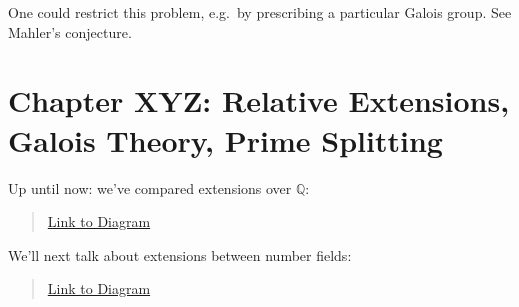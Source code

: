 \begin{remark}

One could restrict this problem, e.g.~by prescribing a particular Galois
group. See Mahler's conjecture.

\end{remark}

\hypertarget{chapter-xyz-relative-extensions-galois-theory-prime-splitting}{%
\section{Chapter XYZ: Relative Extensions, Galois Theory, Prime
Splitting}\label{chapter-xyz-relative-extensions-galois-theory-prime-splitting}}

\begin{remark}

Up until now: we've compared extensions over \({\mathbb{Q}}\):

\begin{center}
\end{center}

\begin{quote}
\href{https://q.uiver.app/?q=WzAsNCxbMCwwLCJLIl0sWzAsMiwiXFxRUSJdLFsyLDAsIlxcWlpfSyJdLFsyLDIsIlxcWloiXSxbMCwxLCIiLDAseyJzdHlsZSI6eyJoZWFkIjp7Im5hbWUiOiJub25lIn19fV0sWzIsMywiIiwwLHsic3R5bGUiOnsiaGVhZCI6eyJuYW1lIjoibm9uZSJ9fX1dXQ==}{Link
to Diagram}
\end{quote}

We'll next talk about extensions between number fields:

\begin{center}
\end{center}

\begin{quote}
\href{https://q.uiver.app/?q=WzAsNCxbMCwwLCJMIl0sWzAsMiwiSyJdLFsyLDAsIlxcWlpfTCJdLFsyLDIsIlxcWlpfSyJdLFswLDEsIiIsMCx7InN0eWxlIjp7ImhlYWQiOnsibmFtZSI6Im5vbmUifX19XSxbMiwzLCIiLDAseyJzdHlsZSI6eyJoZWFkIjp7Im5hbWUiOiJub25lIn19fV1d}{Link
to Diagram}
\end{quote}


\end{remark}
